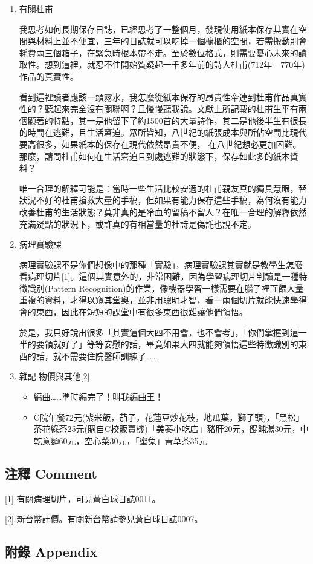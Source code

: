 \documentclass[
]{article}
\providecommand{\tightlist}{%
  \setlength{\itemsep}{0pt}\setlength{\parskip}{0pt}}
\begin{document}
\begin{enumerate}
\def\labelenumi{\arabic{enumi}.}
\item
  有關杜甫

  我思考如何長期保存日誌，已經思考了一整個月，發現使用紙本保存其實在空間與材料上並不便宜，三年的日誌就可以吃掉一個櫥櫃的空間，若需搬動則會耗費兩三個箱子，在緊急時根本帶不走。至於數位格式，則需要憂心未來的讀取性。想到這裡，就忍不住開始質疑起一千多年前的詩人杜甫(712年－770年)作品的真實性。

  看到這裡讀者應該一頭霧水，我怎麼從紙本保存的昂貴性牽連到杜甫作品真實性的？聽起來完全沒有關聯啊？且慢慢聽我說。文獻上所記載的杜甫生平有兩個顯著的特點，其一是他留下了約1500首的大量詩作，其二是他後半生有很長的時間在逃難，且生活窘迫。眾所皆知，八世紀的紙張成本與所佔空間比現代要高很多，如果紙本的保存在現代依然昂貴不便，
  在八世紀想必更加困難。那麼，請問杜甫如何在生活窘迫且到處逃難的狀態下，保存如此多的紙本資料？

  唯一合理的解釋可能是：當時一些生活比較安適的杜甫親友真的獨具慧眼，替狀況不好的杜甫搶救大量的手稿，但如果有能力保存這些手稿，為何沒有能力改善杜甫的生活狀態？莫非真的是冷血的留稿不留人？在唯一合理的解釋依然充滿疑點的狀況下，或許真的有相當量的杜詩是偽託也說不定。
\item
  病理實驗課

  病理實驗課不是你們想像中的那種「實驗」，病理實驗課其實就是教學生怎麼看病理切片{[}1{]}。這個其實意外的，非常困難，因為學習病理切片判讀是一種特徵識別(Pattern
  Recognition)的作業，像機器學習一樣需要在腦子裡面餵大量重複的資料，才得以窺其堂奧，並非用聰明才智，看一兩個切片就能快速學得會的東西，因此在短短的課堂中有很多東西很難讓他們領悟。

  於是，我只好說出很多「其實這個大四不用會，也不會考」，「你們掌握到這一半的要領就好了」等等安慰的話，畢竟如果大四就能夠領悟這些特徵識別的東西的話，就不需要住院醫師訓練了\ldots\ldots{}
\item
  雜記:物價與其他{[}2{]}

  \begin{itemize}
  \tightlist
  \item
    編曲\ldots\ldots 準時編完了！叫我編曲王！
  \item
    C院午餐72元(紫米飯，茄子，花蓮豆炒花枝，地瓜葉，獅子頭)，「黑松」茶花綠茶25元(購自C校販賣機)「美蓁小吃店」豬肝20元，餛飩湯30元，中乾意麵60元，空心菜30元，「蜜兔」青草茶35元
  \end{itemize}
\end{enumerate}

\hypertarget{ux6ce8ux91cb-comment-26}{%
\subsection{注釋 Comment}\label{ux6ce8ux91cb-comment-26}}

{[}1{]} 有關病理切片，可見蒼白球日誌0011。

{[}2{]} 新台幣計價。有關新台幣請參見蒼白球日誌0007。

\hypertarget{ux9644ux9304-appendix-25}{%
\subsection{附錄 Appendix}\label{ux9644ux9304-appendix-25}}
\end{document}

